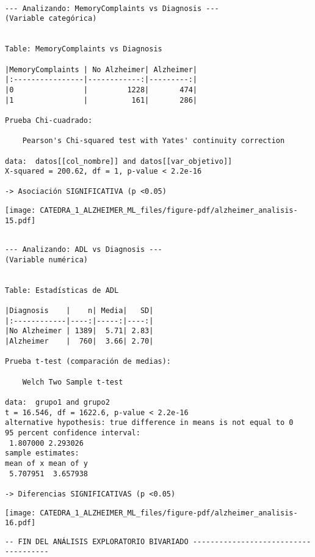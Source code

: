 \documentclass[
  letterpaper,
  DIV=11,
  numbers=noendperiod]{scrartcl}
\begin{document}
\begin{verbatim}

--- Analizando: MemoryComplaints vs Diagnosis ---
(Variable categórica)


Table: MemoryComplaints vs Diagnosis

|MemoryComplaints | No Alzheimer| Alzheimer|
|:----------------|------------:|---------:|
|0                |         1228|       474|
|1                |          161|       286|

Prueba Chi-cuadrado:

    Pearson's Chi-squared test with Yates' continuity correction

data:  datos[[col_nombre]] and datos[[var_objetivo]]
X-squared = 200.62, df = 1, p-value < 2.2e-16

-> Asociación SIGNIFICATIVA (p <0.05)
\end{verbatim}

\begin{center}
\texttt{[image: CATEDRA\_1\_ALZHEIMER\_ML\_files/figure-pdf/alzheimer\_analisis-15.pdf]}
\end{center}

\begin{verbatim}

--- Analizando: ADL vs Diagnosis ---
(Variable numérica)


Table: Estadísticas de ADL

|Diagnosis    |    n| Media|   SD|
|:------------|----:|-----:|----:|
|No Alzheimer | 1389|  5.71| 2.83|
|Alzheimer    |  760|  3.66| 2.70|

Prueba t-test (comparación de medias):

    Welch Two Sample t-test

data:  grupo1 and grupo2
t = 16.546, df = 1622.6, p-value < 2.2e-16
alternative hypothesis: true difference in means is not equal to 0
95 percent confidence interval:
 1.807000 2.293026
sample estimates:
mean of x mean of y 
 5.707951  3.657938 

-> Diferencias SIGNIFICATIVAS (p <0.05)
\end{verbatim}

\begin{center}
\texttt{[image: CATEDRA\_1\_ALZHEIMER\_ML\_files/figure-pdf/alzheimer\_analisis-16.pdf]}
\end{center}

\begin{verbatim}
-- FIN DEL ANÁLISIS EXPLORATORIO BIVARIADO ------------------------------------- 
\end{verbatim}
\end{document}
